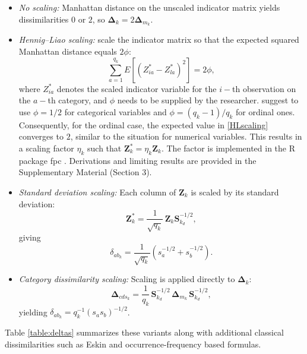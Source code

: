 \documentclass[12pt]{article}
\newcommand{\pkg}[1]{{\normalfont\fontseries{b}\selectfont #1}}
\let\proglang=\textsf
\begin{document}
\begin{itemize}
    \item \emph{No scaling:} Manhattan distance on the unscaled indicator matrix yields dissimilarities $0$ or $2$, so $\bm{\Delta}_k = 2 \bm{\Delta}_{m_k}$.
    \item \emph{Hennig--Liao scaling:} \textcite{HennigLiao2013} scale the indicator matrix so that the expected squared Manhattan distance equals $2\phi$:
    \begin{equation}\label{HLscaling}
        \sum_{a=1}^{q_k} E[(Z^*_{ia} - Z^*_{la})^2] = 2\phi,
    \end{equation}
    where $Z^{*}_{ia}$ denotes the scaled indicator variable for the $i-$th observation on the $a-$th category, and $\phi$ needs to be supplied by the researcher. \textcite{HennigLiao2013} suggest to use $\phi=1/2$ for categorical variables and $\phi=(q_k-1)/q_k$ for ordinal ones. Consequently, for the ordinal case, the expected value in \eqref{HLscaling} converges to $2$, similar to the situation for numerical variables.  This results in a scaling factor $\eta_k$ such that $\mathbf{Z}^*_k = \eta_k \mathbf{Z}_k$. The factor is implemented in the \proglang{R} package \pkg{fpc} \parencite{fpc_pkg}. Derivations and limiting results are provided in the Supplementary Material (Section 3).
    \item \emph{Standard deviation scaling:} Each column of $\mathbf{Z}_k$ is scaled by its standard deviation:
    \begin{equation*}
        \mathbf{Z}_k^* = \frac{1}{\sqrt{q_k}}\, \mathbf{Z}_k \mathbf{S}_{k_d}^{-1/2},
    \end{equation*}
    giving
    \begin{equation*}
        \delta_{ab_k} = \frac{1}{\sqrt{q_k}} (s_a^{-1/2} + s_b^{-1/2}).
    \end{equation*}
    \item \emph{Category dissimilarity scaling:} Scaling is applied directly to $\bm{\Delta}_k$:
    \begin{equation*}
        \bm{\Delta}_{cds_k} = \frac{1}{q_k}\,
        \mathbf{S}_{k_d}^{-1/2}\, \bm{\Delta}_{m_k}\, \mathbf{S}_{k_d}^{-1/2},
    \end{equation*}
    yielding $\delta_{ab_k} = q_k^{-1}(s_a s_b)^{-1/2}$.
\end{itemize}
Table \ref{table:deltas} summarizes these variants along with additional classical dissimilarities such as Eskin and occurrence-frequency based formulas.
\end{document}
